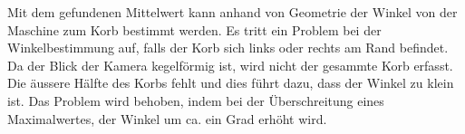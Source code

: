 \noindent
Mit dem gefundenen Mittelwert kann anhand von Geometrie der Winkel von der 
Maschine zum Korb bestimmt werden.  Es tritt ein Problem bei der 
Winkelbestimmung auf, falls der Korb sich links oder rechts am Rand befindet.  
Da der Blick der Kamera kegelförmig ist, wird nicht der gesammte Korb erfasst. 
Die äussere Hälfte des Korbs fehlt und dies führt dazu, dass der Winkel zu 
klein ist. Das Problem wird behoben, indem bei der Überschreitung eines 
Maximalwertes, der Winkel um ca. ein Grad erhöht wird.
